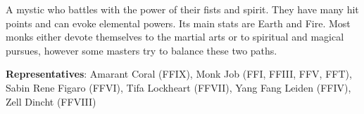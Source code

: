 \begin{jobdesc}[name=pjob-monk]
    A mystic who battles with the power of their fists and spirit. They have many hit points and can evoke elemental powers. Its main stats are Earth and Fire. Most monks either devote themselves to the martial arts or to spiritual and magical pursues, however some masters try to balance these two paths. \pc%

    \textbf{Representatives}: Amarant Coral (FFIX), Monk Job (FFI, FFIII, FFV, FFT), Sabin Rene Figaro (FFVI), Tifa Lockheart (FFVII), Yang Fang Leiden (FFIV), Zell Dincht (FFVIII) \pc%

    \jobstats[hpa=6x,hpb=7x,hpc=8x,hpd=9x,mpa=0x,mpc=1x,armor=Medium,
    weapons=Claws/Gloves \\ Wands \\ Throwing Weapons]
\end{jobdesc}

